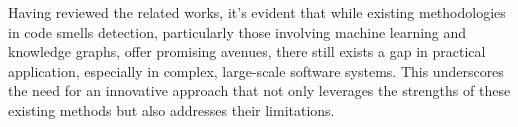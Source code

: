 Having reviewed the related works, it's evident that while existing methodologies in code smells detection, particularly those involving machine learning and knowledge graphs, offer promising avenues, there still exists a gap in practical application, especially in complex, large-scale software systems. This underscores the need for an innovative approach that not only leverages the strengths of these existing methods but also addresses their limitations. 

